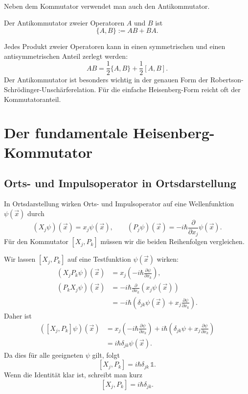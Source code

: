 Neben dem Kommutator verwendet man auch den Antikommutator.

\begin{definitionbox}
Der Antikommutator zweier Operatoren $A$ und $B$ ist
\[
    \{A,B\}:=AB+BA.
\]
\end{definitionbox}

Jedes Produkt zweier Operatoren kann in einen symmetrischen und einen antisymmetrischen Anteil zerlegt werden:
\[
    AB=\frac12\{A,B\}+\frac12[A,B].
\]
Der Antikommutator ist besonders wichtig in der genauen Form der Robertson-Schrödinger-Unschärferelation. Für die einfache Heisenberg-Form reicht oft der Kommutatoranteil.

\section{Der fundamentale Heisenberg-Kommutator}

\subsection{Orts- und Impulsoperator in Ortsdarstellung}

In Ortsdarstellung wirken Orts- und Impulsoperator auf eine Wellenfunktion $\psi(\vec x)$ durch
\[
    (X_j\psi)(\vec x)=x_j\psi(\vec x),
    \qquad
    (P_j\psi)(\vec x)=-i\hbar\frac{\partial}{\partial x_j}\psi(\vec x).
\]
Für den Kommutator $[X_j,P_k]$ müssen wir die beiden Reihenfolgen vergleichen.

\begin{derivationbox}
Wir lassen $[X_j,P_k]$ auf eine Testfunktion $\psi(\vec x)$ wirken:
\[
\begin{aligned}
    (X_jP_k\psi)(\vec x)
    &=x_j\left(-i\hbar\frac{\partial \psi}{\partial x_k}\right), \\
    (P_kX_j\psi)(\vec x)
    &=-i\hbar\frac{\partial}{\partial x_k}\left(x_j\psi(\vec x)\right) \\
    &=-i\hbar\left(\delta_{jk}\psi(\vec x)+x_j\frac{\partial\psi}{\partial x_k}\right).
\end{aligned}
\]
Daher ist
\[
\begin{aligned}
    ([X_j,P_k]\psi)(\vec x)
    &=x_j\left(-i\hbar\frac{\partial\psi}{\partial x_k}\right)
    +i\hbar\left(\delta_{jk}\psi+x_j\frac{\partial\psi}{\partial x_k}\right) \\
    &=i\hbar\delta_{jk}\psi(\vec x).
\end{aligned}
\]
Da dies für alle geeigneten $\psi$ gilt, folgt
\[
    [X_j,P_k]=i\hbar\delta_{jk}\,\mathbb{1}.
\]
Wenn die Identität klar ist, schreibt man kurz
\[
    [X_j,P_k]=i\hbar\delta_{jk}.
\]
\end{derivationbox}

